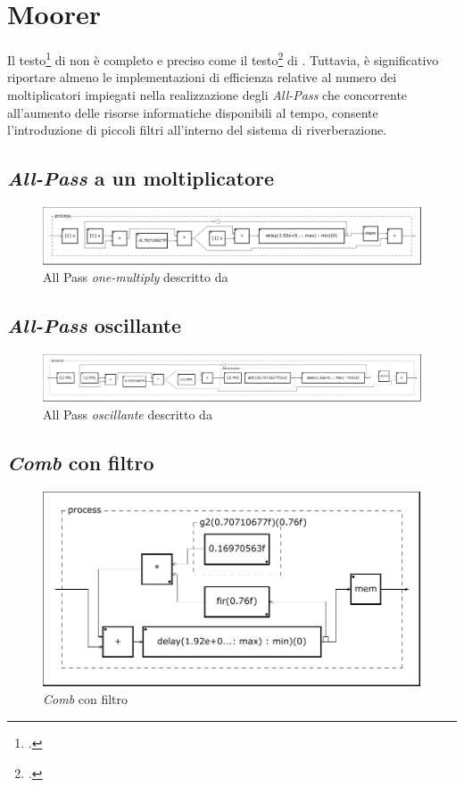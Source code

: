 \section{Moorer}

Il testo\footcite{jm:rev} di \jam non è completo e preciso come il
testo\footcite{ms:rev62} di \ms. Tuttavia, è significativo riportare almeno
le implementazioni di efficienza relative al numero dei moltiplicatori impiegati
nella realizzazione degli \emph{All-Pass} che concorrente all'aumento delle
risorse informatiche disponibili al tempo, consente l'introduzione di piccoli
filtri all'interno del sistema di riverberazione.

\subsection{\emph{All-Pass} a un moltiplicatore}



\begin{figure}[htp]
\centering
\includegraphics[width=1\textwidth]{Code/amapf-svg/process.pdf}
\caption{All Pass \emph{one-multiply} descritto da \jam}
\label{fig:amapf}
\end{figure}

\subsection{\emph{All-Pass} oscillante}



\begin{figure}[htp]
\centering
\includegraphics[width=1\textwidth]{Code/amapfo-svg/process.pdf}
\caption{All Pass \emph{oscillante} descritto da \jam}
\label{fig:amapfo}
\end{figure}

\subsection{\emph{Comb} con filtro}



\begin{figure}[htp]
\centering
\includegraphics[width=1\textwidth]{Code/amcomblp-svg/process.pdf}
\caption{\emph{Comb} con filtro}
\label{fig:amcombfir}
\end{figure}
